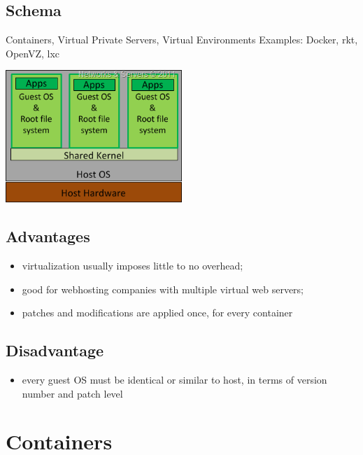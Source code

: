 \documentclass{beamer}
\begin{document}
\subsection{Schema}
\begin{frame}
Containers, Virtual Private Servers, Virtual Environments
\pause
Examples: Docker, rkt, OpenVZ, lxc
\pause
\begin{center}
\includegraphics[width=0.5\textwidth]{images/containers.png}
\end{center}
\end{frame}

\subsection{Advantages}
\begin{frame}
\begin{itemize}
\item virtualization usually imposes little to no overhead;
\pause
\item good for webhosting companies with multiple virtual web servers;
\pause
\item patches and modifications are applied once, for every container
\end{itemize}
\end{frame}

\subsection{Disadvantage}
\begin{frame}
\begin{itemize}
\item every guest OS must be identical or similar to host, in terms of version number and patch level
\end{itemize}
\end{frame}

\section{Containers}
\end{document}
